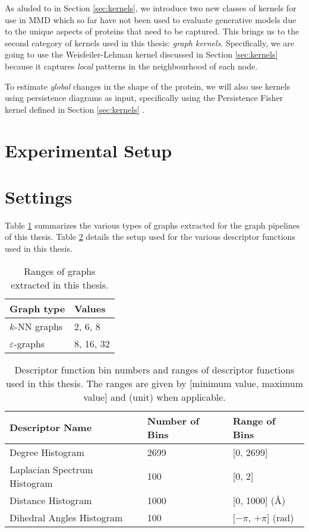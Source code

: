 As aluded to in Section \ref{sec:kernels}, we introduce two new classes of
kernels for use in MMD which so far have not been used to evaluate generative
models due to the unique aspects of proteins that need to be captured. This
brings us to the second category of kernels used in this thesis: \emph{graph kernels}.
Specifically, we are going to use the Weisfeiler-Lehman kernel discussed in
Section \ref{sec:kernels} because it captures \emph{local} patterns in the
neighbourhood of each node.

To estimate \emph{global} changes in the shape of the protein, we will also use
kernels using persistence diagrams as input, specifically using the Persistence
Fisher kernel defined in Section \ref{sec:kernels} \citep{le2018persistence}.


\section{Experimental Setup}

\section{Settings}

Table \ref{tab:graph_extraction} summarizes the various types of graphs
extracted for the graph pipelines of this thesis. Table \ref{tab:descriptor_function_setup} details the setup used for the
various descriptor functions used in this thesis.

\begin{table}
  \centering
  \begin{tabular}{ll}
    \toprule
    \textbf{Graph type} & \textbf{Values} \\
    \midrule
    $k$-NN graphs & 2, 6, 8 \\
    $\varepsilon$-graphs & 8, 16, 32 \\
    \bottomrule
  \end{tabular}
  \caption{Ranges of graphs extracted in this thesis.}
  \label{tab:graph_extraction}
\end{table}


\begin{table}
  \centering
  \begin{tabular}{lll}
    \toprule
    \textbf{Descriptor Name} & \textbf{Number of Bins} & \textbf{Range of Bins} \\
    \midrule
    Degree Histogram & 2699 & [0, 2699] \\
    Laplacian Spectrum Histogram & 100 & [0, 2] \\
    Distance Histogram & 1000 & [0, 1000] (\si{\angstrom}) \\
    Dihedral Angles Histogram & 100 & [$-\pi$, $+\pi$] (rad) \\
    \bottomrule
  \end{tabular}
  \caption{Descriptor function bin numbers and ranges of descriptor functions
    used in this thesis. The ranges are given by
    [minimum value, maximum value] and (unit) when applicable.}
  \label{tab:descriptor_function_setup}
\end{table}



